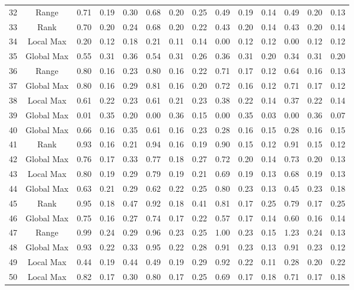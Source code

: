 \documentclass[11pt,a4paper]{article}
\begin{document}
\begin{table}[ht]
{\begin{tabular}{@{\extracolsep{4pt}}cccccccccccccc}
  32 & Range & 0.71 & 0.19 & 0.30 & 0.68 & 0.20 & 0.25 & 0.49 & 0.19 & 0.14 & 0.49 & 0.20 & 0.13 \\ 
  33 & Rank & 0.70 & 0.20 & 0.24 & 0.68 & 0.20 & 0.22 & 0.43 & 0.20 & 0.14 & 0.43 & 0.20 & 0.14 \\ 
  34 & Local Max & 0.20 & 0.12 & 0.18 & 0.21 & 0.11 & 0.14 & 0.00 & 0.12 & 0.12 & 0.00 & 0.12 & 0.12 \\ 
  35 & Global Max & 0.55 & 0.31 & 0.36 & 0.54 & 0.31 & 0.26 & 0.36 & 0.31 & 0.20 & 0.34 & 0.31 & 0.20 \\ 
  36 & Range & 0.80 & 0.16 & 0.23 & 0.80 & 0.16 & 0.22 & 0.71 & 0.17 & 0.12 & 0.64 & 0.16 & 0.13 \\ 
  37 & Global Max & 0.80 & 0.16 & 0.29 & 0.81 & 0.16 & 0.20 & 0.72 & 0.16 & 0.12 & 0.71 & 0.17 & 0.12 \\ 
  38 & Local Max & 0.61 & 0.22 & 0.23 & 0.61 & 0.21 & 0.23 & 0.38 & 0.22 & 0.14 & 0.37 & 0.22 & 0.14 \\ 
  39 & Global Max & 0.01 & 0.35 & 0.20 & 0.00 & 0.36 & 0.15 & 0.00 & 0.35 & 0.03 & 0.00 & 0.36 & 0.07 \\ 
  40 & Global Max & 0.66 & 0.16 & 0.35 & 0.61 & 0.16 & 0.23 & 0.28 & 0.16 & 0.15 & 0.28 & 0.16 & 0.15 \\ 
  41 & Rank & 0.93 & 0.16 & 0.21 & 0.94 & 0.16 & 0.19 & 0.90 & 0.15 & 0.12 & 0.91 & 0.15 & 0.12 \\ 
  42 & Global Max & 0.76 & 0.17 & 0.33 & 0.77 & 0.18 & 0.27 & 0.72 & 0.20 & 0.14 & 0.73 & 0.20 & 0.13 \\ 
  43 & Local Max & 0.80 & 0.19 & 0.29 & 0.79 & 0.19 & 0.21 & 0.69 & 0.19 & 0.13 & 0.68 & 0.19 & 0.13 \\ 
  44 & Global Max & 0.63 & 0.21 & 0.29 & 0.62 & 0.22 & 0.25 & 0.80 & 0.23 & 0.13 & 0.45 & 0.23 & 0.18 \\ 
  45 & Rank & 0.95 & 0.18 & 0.47 & 0.92 & 0.18 & 0.41 & 0.81 & 0.17 & 0.25 & 0.79 & 0.17 & 0.25 \\ 
  46 & Global Max & 0.75 & 0.16 & 0.27 & 0.74 & 0.17 & 0.22 & 0.57 & 0.17 & 0.14 & 0.60 & 0.16 & 0.14 \\ 
  47 & Range & 0.99 & 0.24 & 0.29 & 0.96 & 0.23 & 0.25 & 1.00 & 0.23 & 0.15 & 1.23 & 0.24 & 0.13 \\ 
  48 & Global Max & 0.93 & 0.22 & 0.33 & 0.95 & 0.22 & 0.28 & 0.91 & 0.23 & 0.13 & 0.91 & 0.23 & 0.12 \\ 
  49 & Local Max & 0.44 & 0.19 & 0.44 & 0.49 & 0.19 & 0.29 & 0.92 & 0.22 & 0.11 & 0.28 & 0.20 & 0.22 \\ 
  50 & Local Max & 0.82 & 0.17 & 0.30 & 0.80 & 0.17 & 0.25 & 0.69 & 0.17 & 0.18 & 0.71 & 0.17 & 0.18 \\ 

 \hline

\end{tabular}
}
\end{table}
\end{document}
